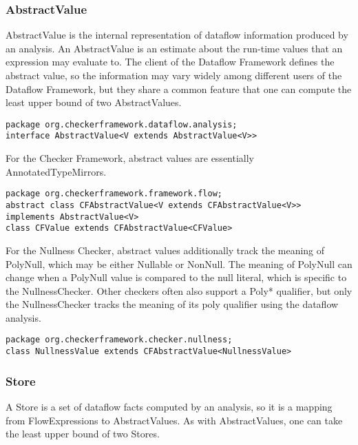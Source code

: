 \subsubsection{AbstractValue}
\label{sec:abstract_value_classes}

AbstractValue is the internal representation of dataflow information
produced by an analysis.  An AbstractValue is an estimate about the
run-time values that an expression may evaluate to.  The client of the
Dataflow Framework defines the abstract value, so the information may
vary widely among different users of the Dataflow Framework, but they
share a common feature that one can compute the least upper bound of
two AbstractValues.

\begin{verbatim}
package org.checkerframework.dataflow.analysis;
interface AbstractValue<V extends AbstractValue<V>>
\end{verbatim}

For the Checker Framework, abstract values are essentially
AnnotatedTypeMirrors.

\begin{verbatim}
package org.checkerframework.framework.flow;
abstract class CFAbstractValue<V extends CFAbstractValue<V>> implements AbstractValue<V>
class CFValue extends CFAbstractValue<CFValue>
\end{verbatim}

For the Nullness Checker, abstract values additionally track the
meaning of PolyNull, which may be either Nullable or NonNull.  The
meaning of PolyNull can change when a PolyNull value is compared to
the null literal, which is specific to the NullnessChecker.  Other
checkers often also support a Poly* qualifier, but only the
NullnessChecker tracks the meaning of its poly qualifier using the
dataflow analysis.

\begin{verbatim}
package org.checkerframework.checker.nullness;
class NullnessValue extends CFAbstractValue<NullnessValue>
\end{verbatim}


\subsubsection{Store}
\label{sec:store_classes}

A Store is a set of dataflow facts computed by an analysis, so it is a
mapping from FlowExpressions to AbstractValues.  As with
AbstractValues, one can take the least upper bound of two Stores.

